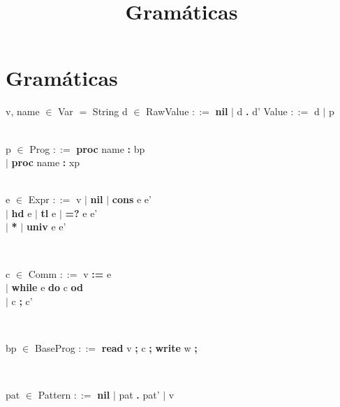 \documentclass[a4paper,10pt]{article}
\title{Gramáticas}
\author{}
\date{}
\newcommand{\nt}[1]{\textbf{#1}}
\begin{document}
\maketitle

\section{Gramáticas}

\indent \indent v, name $\in$ Var $=$ String \hspace{15pt}
d $\in$ RawValue $::=$ \nt{nil} $|$ d \nt{.} d' \hspace{15pt}
Value $::=$ d $|$ p\\

\

p $\in$ Prog $::=$ \nt{proc} name \nt{:} bp\\
\indent \hspace{45pt} $|$ \nt{proc} name \nt{:} xp\\

\

e $\in$ Expr $::=$ v $|$ \nt{nil} $|$ \nt{cons} e e'\\
\indent \hspace{45pt} $|$ \nt{hd} e $|$ \nt{tl} e $|$ \nt{=?} e e'\\
\indent \hspace{45pt}  $|$ \nt{*} $|$ \nt{univ} e e'

\

c $\in$ Comm $::=$ v \nt{:=} e \\
\indent \hspace{50pt} $|$ \nt{while} e \nt{do} c \nt{od}\\
\indent \hspace{50pt} $|$ c \nt{;} c'

\

bp $\in$ BaseProg $::=$ \nt{read} v \nt{;} c \nt{;} \nt{write} w \nt{;}

\

pat $\in$ Pattern $::=$ \nt{nil} $|$ pat \nt{.} pat' $|$ v

\
\end{document}
